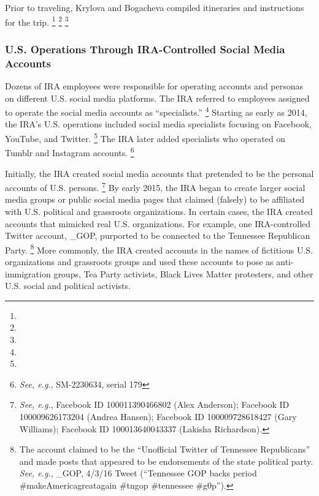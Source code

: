 Prior to traveling, Krylova and Bogacheva compiled itineraries and instructions for the trip.
\footnote{}
\footnote{}
\footnote{}

\subsubsection{U.S. Operations Through IRA-Controlled Social Media Accounts}

Dozens of IRA employees were responsible for operating accounts and personas on different U.S. social media platforms.
The IRA referred to employees assigned to operate the social media accounts as ``specialists.''%
\footnote{}
Starting as early as 2014, the IRA's U.S. operations included social media specialists focusing on Facebook, YouTube, and Twitter.%
\footnote{}
The IRA later added specialists who operated on Tumblr and Instagram accounts.%
\footnote{\textit{See, e.g.}, SM-2230634, serial 179}

Initially, the IRA created social media accounts that pretended to be the personal accounts of U.S. persons.%
\footnote{\textit{See, e.g.}, Facebook ID 100011390466802 (Alex Anderson);
Facebook ID 100009626173204 (Andrea Hansen);
Facebook ID 100009728618427 (Gary Williams);
Facebook ID 100013640043337 (Lakisha Richardson).}
By early 2015, the IRA began to create larger social media groups or public social media pages that claimed (falsely) to be affiliated with U.S. political and grassroots organizations.
In certain cases, the IRA created accounts that mimicked real U.S. organizations.
For example, one IRA-controlled Twitter account, \@TEN\_GOP, purported to be connected to the Tennessee Republican Party.%
\footnote{The account claimed to be the ``Unofficial Twitter of Tennessee Republicans'' and made posts that appeared to be endorsements of the state political party.
\textit{See, e.g.}, \@TEN\_GOP, 4/3/16 Tweet (``Tennessee GOP backs \@realDonaldTrump period \#makeAmericagreatagain \#tngop \#tennessee \#g0p'').}
More commonly, the IRA created accounts in the names of fictitious U.S. organizations and grassroots groups and used these accounts to pose as anti-immigration groups, Tea Party activists, Black Lives Matter protesters, and other U.S. social and political activists.

